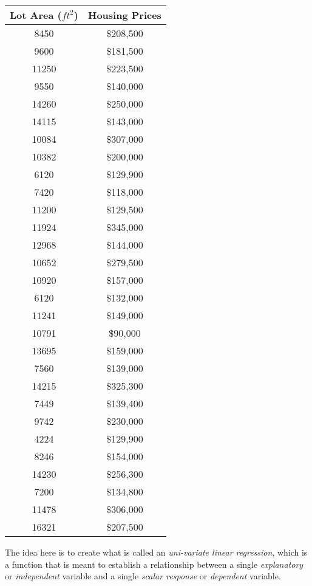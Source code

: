 \documentclass{book}[a5paper]
\begin{document}
\begin{table}
    \label{table:house_price}
    \centering
    \begin{tabular}{c|c}
        Lot Area (${ft}^2$) & Housing Prices \\
        \hline
        8450 & \$208,500 \\
        9600 & \$181,500 \\
        11250 & \$223,500 \\
        9550 & \$140,000 \\
        14260 & \$250,000 \\
        14115 & \$143,000 \\
        10084 & \$307,000 \\
        10382 & \$200,000 \\
        6120 & \$129,900 \\
        7420 & \$118,000 \\
        11200 & \$129,500 \\
        11924 & \$345,000 \\
        12968 & \$144,000 \\
        10652 & \$279,500 \\
        10920 & \$157,000 \\
        6120 & \$132,000 \\
        11241 & \$149,000 \\
        10791 & \$90,000 \\
        13695 & \$159,000 \\
        7560 & \$139,000 \\
        14215 & \$325,300 \\
        7449 & \$139,400 \\
        9742 & \$230,000 \\
        4224 & \$129,900 \\
        8246 & \$154,000 \\
        14230 & \$256,300 \\
        7200 & \$134,800 \\
        11478 & \$306,000 \\
        16321 & \$207,500 \\
    \end{tabular}
\end{table}

The idea here is to create what is called an \emph{uni-variate linear
regression}, which is a function that is meant to establish a relationship
between a single \emph{explanatory} or \emph{independent} variable and a single
\emph{scalar response} or \emph{dependent} variable.  
\end{document}
